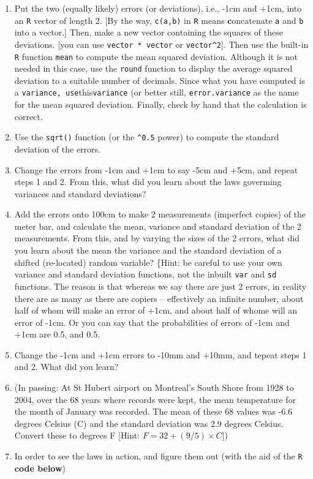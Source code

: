 \documentclass[
]{article}
\begin{document}
\begin{enumerate}
\def\labelenumi{\arabic{enumi}.}
\item
  Put the two (equally likely) errors (or deviations), i.e., -1cm and
  +1cm, into an \texttt{R} vector of length 2. {[}By the way,
  \texttt{c(a,b)} in \texttt{R} means \textbf{c}oncatenate \texttt{a}
  and \texttt{b} into a vector.{]} Then, make a new vector containing
  the squares of these deviations. {[}you can use
  \texttt{vector\ *\ vector} or \texttt{vector\^{}2}{]}. Then use the
  built-in \texttt{R} function \texttt{mean} to compute the mean squared
  deviation. Although it is not needed in this case, use the
  \texttt{round} function to display the average squared deviation to a
  suitable number of decimals. Since what you have computed is a
  \texttt{variance\textquotesingle{},\ use}this\texttt{variance} (or
  better still, \texttt{error.variance} as the name for the mean squared
  deviation. Finally, check by hand that the calculation is correct.
\item
  Use the \texttt{sqrt()} function (or the \texttt{\^{}0.5} power) to
  compute the standard deviation of the errors.
\item
  Change the errors from -1cm and +1cm to say -5cm and +5cm, and repeat
  steps 1 and 2. From this, what did you learn about the laws goverming
  variances and standard deviations?
\item
  Add the errors onto 100cm to make 2 measurements (imperfect copies) of
  the meter bar, and calculate the mean, variance and standard deviation
  of the 2 measurements. From this, and by varying the sizes of the 2
  errors, what did you learn about the mean the variance and the
  standard deviation of a shifted (re-located) random variable? \{Hint:
  be careful to use your own variance and standard deviation functions,
  not the inbuilt \texttt{var} and \texttt{sd} functions. The reason is
  that whereas we say there are just 2 errors, in reality there are as
  many as there are copiers -- effectively an infinite number, about
  half of whom will make an error of +1cm, and about half of whome will
  an error of -1cm. Or you can say that the probabilities of errors of
  -1cm and +1cm are 0.5, and 0.5.
\item
  Change the -1cm and +1cm errors to -10mm and +10mm, and tepeat steps 1
  and 2. What did you learn?
\item
  (In passing: At St Hubert airport on Montreal's South Shore from 1928
  to 2004, over the 68 years where records were kept, the mean
  temperature for the month of January was recorded. The mean of these
  68 values was -6.6 degrees Celsius (C) and the standard deviation was
  2.9 degrees Celsius. Convert these to degrees F {[}Hint:
  \(F = 32 + (9/5) \times C\){]})
\item
  In order to see the laws in action, and figure them out (with the aid
  of the \texttt{R} \textbf{code below})


\end{enumerate}
\end{document}
